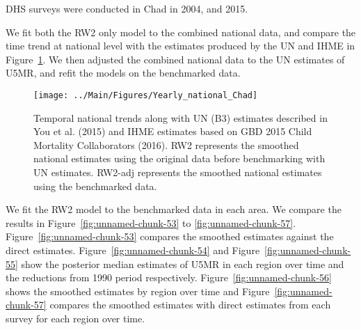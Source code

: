 \documentclass[12pt]{article}\usepackage[]{graphicx}\usepackage[]{color}
\newenvironment{knitrout}{}{} %
\begin{document}


DHS surveys were conducted in Chad in 2004, and 2015.

We fit both the RW2 only model to the combined national data, and compare the time trend at national level with the estimates produced by the UN and IHME in Figure~\ref{fig:unnamed-chunk-52}. We then adjusted the combined national data to the UN estimates of U5MR, and refit the models on the benchmarked data. 

\begin{knitrout}
\color{fgcolor}\begin{figure}[bht]

{\centering \texttt{[image: ../Main/Figures/Yearly\_national\_Chad]} 

}

\caption[Temporal national trends along with UN (B3) estimates described in You et al]{Temporal national trends along with UN (B3) estimates described in You et al. (2015) and IHME estimates based on GBD 2015 Child Mortality Collaborators (2016). RW2 represents the smoothed national estimates using the original data before benchmarking with UN estimates. RW2-adj represents the smoothed national estimates using the benchmarked data.}\label{fig:unnamed-chunk-52}
\end{figure}


\end{knitrout}
 

We fit the RW2 model to the benchmarked data in each area. 
We compare the results in Figure~\ref{fig:unnamed-chunk-53} to \ref{fig:unnamed-chunk-57}.
Figure~\ref{fig:unnamed-chunk-53} compares the smoothed estimates against the direct estimates. Figure~\ref{fig:unnamed-chunk-54} and Figure~\ref{fig:unnamed-chunk-55} show the posterior median estimates of U5MR in each region over time and the reductions from 1990 period respectively.
Figure~\ref{fig:unnamed-chunk-56} shows the smoothed estimates by region over time and Figure~\ref{fig:unnamed-chunk-57} compares the smoothed estimates with direct estimates from each survey for each region over time.


\end{document}
